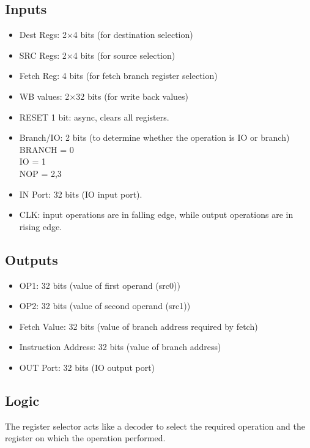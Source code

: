 \subsection{Inputs}
\begin{itemize}
    \item Dest Regs: 2$\times$4 bits (for destination selection)
    \item SRC Regs: 2$\times$4 bits (for source selection)
    \item Fetch Reg: 4 bits (for fetch branch register selection)
    \item WB values: 2$\times$32 bits (for write back values)
    \item RESET 1 bit: async, clears all registers.
    \item Branch/IO: 2 bits (to determine whether the operation is IO or branch)\\
    BRANCH = 0\\
    IO = 1\\
    NOP = 2,3 %
    \item IN Port: 32 bits (IO input port).
    \item CLK: input operations are in falling edge, while output operations are in rising edge.
\end{itemize}

\subsection{Outputs}
\begin{itemize}
    \item OP1: 32 bits (value of first operand (src0))
    \item OP2: 32 bits (value of second operand (src1))
    \item Fetch Value: 32 bits (value of branch address required by fetch)
    \item Instruction Address: 32 bits (value of branch address)
    \item OUT Port: 32 bits (IO output port)
\end{itemize}

\subsection{Logic}
The register selector acts like a decoder to select the required operation and the register on which the operation performed.

